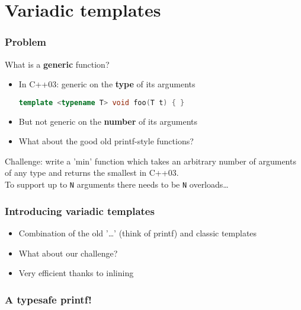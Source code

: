 \documentclass[xcolor=dvipsnames]{beamer}
\begin{document}
\section{Variadic templates}
\begin{frame}[fragile]
  \frametitle{Problem}
  What is a \textbf{generic} function?
  \pause
  \begin{itemize}
    \item In C++03: generic on the \textbf{type} of its arguments\\
      \begin{lstlisting}[language=cpp]
        template <typename T> void foo(T t) { }
      \end{lstlisting}
    \pause
    \item But not generic on the \textbf{number} of its arguments
    \pause
    \item What about the good old printf-style functions?
  \end{itemize}
  \pause
  Challenge: write a 'min' function which takes an arbitrary number of arguments
  of any type and returns the smallest in C++03.\\
  \pause
  \vspace{0.5cm}
  To support up to \verb#N# arguments there needs to be \verb#N# overloads\ldots
\end{frame}

\begin{frame}[fragile]
  \frametitle{Introducing variadic templates}
  \begin{itemize}
    \item Combination of the old '\ldots' (think of printf) and classic templates
    \pause
    \item What about our challenge?
    \pause
  \end{itemize}

  

  \begin{itemize}
    \item Very efficient thanks to inlining
  \end{itemize}
\end{frame}

\begin{frame}[fragile]
    
  \frametitle{A typesafe printf!}

  
\end{frame}
\end{document}

